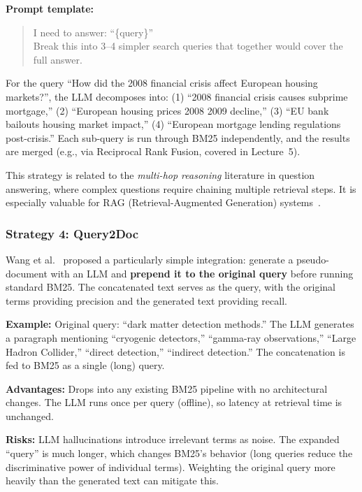 \documentclass[11pt,a4paper]{article}
\theoremstyle{definition}
\theoremstyle{plain}
\begin{document}
\textbf{Prompt template:}
\begin{quote}
\ttfamily I need to answer: ``\{query\}''\\
Break this into 3--4 simpler search queries that together would cover the full answer.
\end{quote}

For the query ``How did the 2008 financial crisis affect European housing markets?'', the LLM decomposes into: (1) ``2008 financial crisis causes subprime mortgage,'' (2) ``European housing prices 2008 2009 decline,'' (3) ``EU bank bailouts housing market impact,'' (4) ``European mortgage lending regulations post-crisis.'' Each sub-query is run through BM25 independently, and the results are merged (e.g., via Reciprocal Rank Fusion, covered in Lecture~5).

This strategy is related to the \emph{multi-hop reasoning} literature in question answering, where complex questions require chaining multiple retrieval steps. It is especially valuable for RAG (Retrieval-Augmented Generation) systems~\cite{lewis2020rag}.

\subsubsection{Strategy 4: Query2Doc}

Wang et al.~\cite{wang2023query2doc} proposed a particularly simple integration: generate a pseudo-document with an LLM and \textbf{prepend it to the original query} before running standard BM25. The concatenated text serves as the query, with the original terms providing precision and the generated text providing recall.

\textbf{Example:} Original query: ``dark matter detection methods.'' The LLM generates a paragraph mentioning ``cryogenic detectors,'' ``gamma-ray observations,'' ``Large Hadron Collider,'' ``direct detection,'' ``indirect detection.'' The concatenation is fed to BM25 as a single (long) query.

\textbf{Advantages:} Drops into any existing BM25 pipeline with no architectural changes. The LLM runs once per query (offline), so latency at retrieval time is unchanged.

\textbf{Risks:} LLM hallucinations introduce irrelevant terms as noise. The expanded ``query'' is much longer, which changes BM25's behavior (long queries reduce the discriminative power of individual terms). Weighting the original query more heavily than the generated text can mitigate this.
\end{document}
